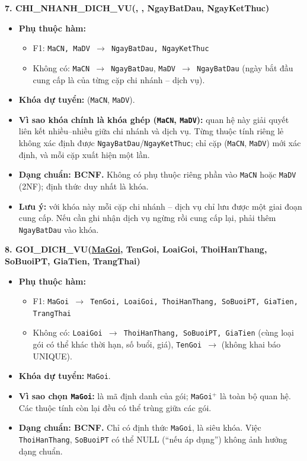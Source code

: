 \documentclass[11pt, a4paper]{article}
\newcommand{\pk}[1]{\bgroup\ULdepth=1.8pt\uline{#1}\egroup}
\newcommand{\pkfk}[1]{\bgroup\ULdepth=1.8pt\uline{\bgroup\ULdepth=4.0pt\dashuline{#1}\egroup}\egroup}
\begin{document}
\textbf{7. CHI\_NHANH\_DICH\_VU(\pkfk{MaCN}, \pkfk{MaDV}, NgayBatDau, NgayKetThuc)}
\begin{itemize}
    \item \textbf{Phụ thuộc hàm:}
    \begin{itemize}
        \item F1: \texttt{MaCN, MaDV $\rightarrow$ NgayBatDau, NgayKetThuc}
        \item Không có: \texttt{MaCN $\rightarrow$ NgayBatDau}, \texttt{MaDV $\rightarrow$ NgayBatDau} (ngày bắt đầu cung cấp là của từng cặp chi nhánh -- dịch vụ).
    \end{itemize}
    \item \textbf{Khóa dự tuyển:} (\texttt{MaCN}, \texttt{MaDV}).
    \item \textbf{Vì sao khóa chính là khóa ghép (\texttt{MaCN}, \texttt{MaDV}):} quan hệ này giải quyết liên kết nhiều--nhiều giữa chi nhánh và dịch vụ. Từng thuộc tính riêng lẻ không xác định được \texttt{NgayBatDau}/\texttt{NgayKetThuc}; chỉ cặp (\texttt{MaCN}, \texttt{MaDV}) mới xác định, và mỗi cặp xuất hiện một lần.
    \item \textbf{Dạng chuẩn: BCNF.} Không có phụ thuộc riêng phần vào \texttt{MaCN} hoặc \texttt{MaDV} (2NF); định thức duy nhất là khóa.
    \item \textbf{Lưu ý:} với khóa này mỗi cặp chi nhánh -- dịch vụ chỉ lưu được một giai đoạn cung cấp. Nếu cần ghi nhận dịch vụ ngừng rồi cung cấp lại, phải thêm \texttt{NgayBatDau} vào khóa.
\end{itemize}

\textbf{8. GOI\_DICH\_VU(\pk{MaGoi}, TenGoi, LoaiGoi, ThoiHanThang, SoBuoiPT, GiaTien, TrangThai)}
\begin{itemize}
    \item \textbf{Phụ thuộc hàm:}
    \begin{itemize}
        \item F1: \texttt{MaGoi $\rightarrow$ TenGoi, LoaiGoi, ThoiHanThang, SoBuoiPT, GiaTien, TrangThai}
        \item Không có: \texttt{LoaiGoi $\rightarrow$ ThoiHanThang, SoBuoiPT, GiaTien} (cùng loại gói có thể khác thời hạn, số buổi, giá), \texttt{TenGoi $\rightarrow$} (không khai báo UNIQUE).
    \end{itemize}
    \item \textbf{Khóa dự tuyển:} \texttt{MaGoi}.
    \item \textbf{Vì sao chọn \texttt{MaGoi}:} là mã định danh của gói; \texttt{MaGoi$^+$} là toàn bộ quan hệ. Các thuộc tính còn lại đều có thể trùng giữa các gói.
    \item \textbf{Dạng chuẩn: BCNF.} Chỉ có định thức \texttt{MaGoi}, là siêu khóa. Việc \texttt{ThoiHanThang}, \texttt{SoBuoiPT} có thể NULL (``nếu áp dụng'') không ảnh hưởng dạng chuẩn.
\end{itemize}
\end{document}
